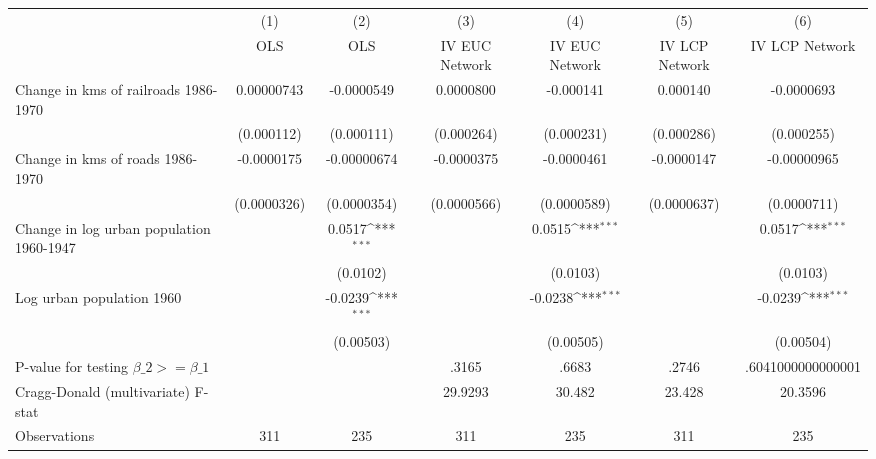 {
\def\sym#1{\ifmmode^{#1}\else\(^{#1}\)\fi}
\begin{tabular}{l*{6}{c}}
\hline\hline
                &\multicolumn{1}{c}{(1)}&\multicolumn{1}{c}{(2)}&\multicolumn{1}{c}{(3)}&\multicolumn{1}{c}{(4)}&\multicolumn{1}{c}{(5)}&\multicolumn{1}{c}{(6)}\\
                &\multicolumn{1}{c}{OLS}&\multicolumn{1}{c}{OLS}&\multicolumn{1}{c}{IV EUC Network}&\multicolumn{1}{c}{IV EUC Network}&\multicolumn{1}{c}{IV LCP Network}&\multicolumn{1}{c}{IV LCP Network}\\
\hline
Change in kms of railroads 1986-1970&0.00000743         &-0.0000549         &0.0000800         &-0.000141         & 0.000140         &-0.0000693         \\
                &(0.000112)         &(0.000111)         &(0.000264)         &(0.000231)         &(0.000286)         &(0.000255)         \\
[1em]
Change in kms of roads 1986-1970&-0.0000175         &-0.00000674         &-0.0000375         &-0.0000461         &-0.0000147         &-0.00000965         \\
                &(0.0000326)         &(0.0000354)         &(0.0000566)         &(0.0000589)         &(0.0000637)         &(0.0000711)         \\
[1em]
Change in log urban population 1960-1947&                  &   0.0517\sym{***}&                  &   0.0515\sym{***}&                  &   0.0517\sym{***}\\
                &                  & (0.0102)         &                  & (0.0103)         &                  & (0.0103)         \\
[1em]
Log urban population 1960&                  &  -0.0239\sym{***}&                  &  -0.0238\sym{***}&                  &  -0.0239\sym{***}\\
                &                  &(0.00503)         &                  &(0.00505)         &                  &(0.00504)         \\
\hline
P-value for testing $\beta\_{2} >= \beta\_{1}$&                  &                  &    .3165         &    .6683         &    .2746         &.6041000000000001         \\
Cragg-Donald (multivariate) F-stat&                  &                  &  29.9293         &   30.482         &   23.428         &  20.3596         \\
Observations    &      311         &      235         &      311         &      235         &      311         &      235         \\
\hline\hline
\end{tabular}
}
